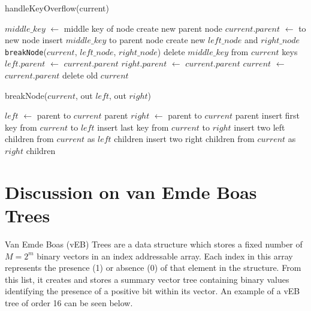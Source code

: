 \documentclass{article}
\begin{document}
\begin{function}
	\caption{handleKeyOverflow(current)}
	\DontPrintSemicolon
	{
		$middle\_key$ $\gets$ middle key of node\;
		{
			create new parent node\;
			$current.parent$ $\gets$ to new node\;
		}
		insert $middle\_key$ to parent node\;
		create new $left\_node$ and $right\_node$\;
		\texttt{breakNode}($current$, $left\_node$, $right\_node$)\;
		delete $middle\_key$ from $current$ keys\;
		$left.parent$ $\gets$ $current.parent$\;
		$right.parent$ $\gets$ $current.parent$\;
		$current$ $\gets$ $current.parent$\;
		delete old $current$\;
	}
\end{function}

\begin{function}
	\caption{breakNode($current$, out $left$, out $right$)}
	\DontPrintSemicolon
	$left$ $\gets$ parent to $current$ parent\;
	$right$ $\gets$ parent to $current$ parent\;
	insert first key from $current$ to $left$\;
	insert last key from $current$ to $right$\;
	{
		insert two left children from $current$ as $left$ children\;
		insert two right children from $current$ as $right$ children\;
	}
\end{function}

\vspace{1in}

\section*{Discussion on van Emde Boas Trees}

Van Emde Boas (vEB) Trees are a data structure which stores a fixed number of ${M = 2^m}$ binary vectors in an index addressable array. Each index in this array represents the presence (1) or absence (0) of that element in the structure. From this list, it creates and stores a summary vector tree containing binary values identifying the presence of a positive bit within its vector. An example of a vEB tree of order 16 can be seen below.
\end{document}
